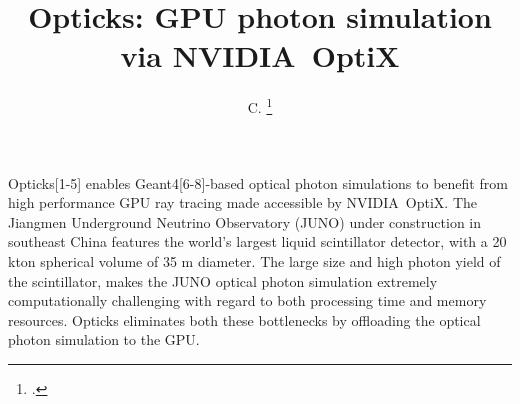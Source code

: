 \documentclass{webofc}
\newcommand{\comment}[1]{}
\begin{document}
%
\title{Opticks: GPU photon simulation via NVIDIA\textregistered\ OptiX\texttrademark}

\author{ C. \fnsep\thanks{.}}


%
\maketitle
%
%
\label{intro}
%
\comment{
The introduction should provide background that puts the manuscript into
context and allows readers outside the field to understand the purpose and
significance of the study. It should define the problem addressed and explain
why it is important.
}
%
Opticks[1-5] enables Geant4[6-8]-based optical photon simulations 
to benefit from high performance GPU ray tracing made accessible 
by NVIDIA\textregistered\ OptiX\texttrademark[9-11].
%
The Jiangmen Underground Neutrino Observatory (JUNO)\cite{juno} 
under construction in southeast China features the world's largest liquid scintillator detector, 
with a 20 kton spherical volume of 35 m diameter. The large size and high photon yield
of the scintillator, makes the JUNO optical photon simulation extremely computationally 
challenging with regard to both processing time and memory resources. Opticks eliminates both these 
bottlenecks by offloading the optical photon simulation to the GPU. 
\end{document}
